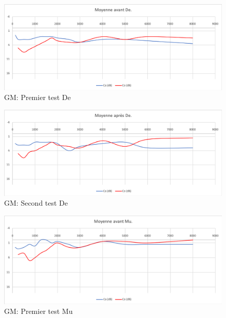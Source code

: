 
 
 
  \clearpage
 
 \begin{figure}[th]
 	\centering
 	\includegraphics[width=1\linewidth]{images/graphiques/moyavDE.png}
 	\caption[GM: Patient De : 1° test]{GM: Premier test De}
 	\label{fig:moyavde}
 \end{figure}
 
 
 \begin{figure}[th]
 	\centering
 	\includegraphics[width=1\linewidth]{images/graphiques/moyaprDE}
 	\caption[GM: Patient De : 2° test]{GM: Second test De}
 	\label{fig:moyaprde}
 \end{figure}
 
 
 
 
 \begin{figure}[th]
 	\centering
 	\includegraphics[width=1\linewidth]{images/graphiques/moyavMU.png}
 	\caption[GM: Patient Mu : 1° test]{GM: Premier test Mu}
 	\label{fig:moyavmu}
 \end{figure}
 
